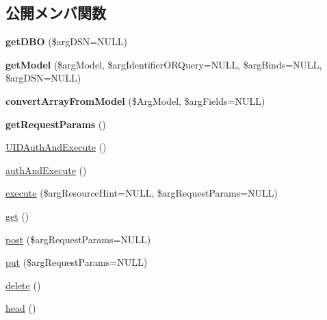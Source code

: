 \subsection*{公開メンバ関数}
\begin{DoxyCompactItemize}
\item 
\hypertarget{class_rest_controller_base_a26a400c6a6547ff09c8badcbe62af52a}{}{\bfseries get\+D\+B\+O} (\$arg\+D\+S\+N=N\+U\+L\+L)\label{class_rest_controller_base_a26a400c6a6547ff09c8badcbe62af52a}

\item 
\hypertarget{class_rest_controller_base_a7a2a49f6743241f8cbaaddb08bcc4c2b}{}{\bfseries get\+Model} (\$arg\+Model, \$arg\+Identifier\+O\+R\+Query=N\+U\+L\+L, \$arg\+Binds=N\+U\+L\+L, \$arg\+D\+S\+N=N\+U\+L\+L)\label{class_rest_controller_base_a7a2a49f6743241f8cbaaddb08bcc4c2b}

\item 
\hypertarget{class_rest_controller_base_a59b19c50ca7006f746d91d7237018e01}{}{\bfseries convert\+Array\+From\+Model} (\$Arg\+Model, \$arg\+Fields=N\+U\+L\+L)\label{class_rest_controller_base_a59b19c50ca7006f746d91d7237018e01}

\item 
\hypertarget{class_rest_controller_base_a95ad94f5d58231686aea32c58749175c}{}{\bfseries get\+Request\+Params} ()\label{class_rest_controller_base_a95ad94f5d58231686aea32c58749175c}

\item 
\hyperlink{class_rest_controller_base_a648e6ebeaef466e01e6281c1178d2cc0}{U\+I\+D\+Auth\+And\+Execute} ()
\item 
\hyperlink{class_rest_controller_base_ae3e9e4f549693f6b28edd415e9b38747}{auth\+And\+Execute} ()
\item 
\hyperlink{class_rest_controller_base_aba28a2fce30920ac9e816d6dde7f8d2f}{execute} (\$arg\+Resource\+Hint=N\+U\+L\+L, \$arg\+Request\+Params=N\+U\+L\+L)
\item 
\hyperlink{class_rest_controller_base_a842a9ecef6680268e367a44c4df951a2}{get} ()
\item 
\hyperlink{class_rest_controller_base_a305d42e434b069c7c7e5916f2c46682a}{post} (\$arg\+Request\+Params=N\+U\+L\+L)
\item 
\hyperlink{class_rest_controller_base_a95556be57cfc461f8703f0f369ee05d5}{put} (\$arg\+Request\+Params=N\+U\+L\+L)
\item 
\hyperlink{class_rest_controller_base_a1a30a132626984159384c227f5cdc717}{delete} ()
\item 
\hyperlink{class_rest_controller_base_adbae680f95aaf268f9673790fb592d3c}{head} ()
\end{DoxyCompactItemize}

